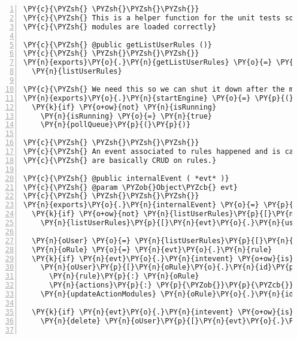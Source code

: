 \begin{Verbatim}[fontsize=\scriptsize,commandchars=\\\{\},numbers=left,firstnumber=1,stepnumber=1]
\PY{c}{\PYZsh{} \PYZsh{}\PYZsh{}\PYZsh{}}
\PY{c}{\PYZsh{} This is a helper function for the unit tests so we can verify that action}
\PY{c}{\PYZsh{} modules are loaded correctly}

\PY{c}{\PYZsh{} @public getListUserRules ()}
\PY{c}{\PYZsh{} \PYZsh{}\PYZsh{}\PYZsh{}}
\PY{n}{exports}\PY{o}{.}\PY{n}{getListUserRules} \PY{o}{=} \PY{p}{(}\PY{p}{)} \PY{o}{\PYZhy{}}\PY{o}{\PYZgt{}}
  \PY{n}{listUserRules}

\PY{c}{\PYZsh{} We need this so we can shut it down after the module unit tests}
\PY{n}{exports}\PY{o}{.}\PY{n}{startEngine} \PY{o}{=} \PY{p}{(}\PY{p}{)} \PY{o}{\PYZhy{}}\PY{o}{\PYZgt{}}
  \PY{k}{if} \PY{o+ow}{not} \PY{n}{isRunning}
    \PY{n}{isRunning} \PY{o}{=} \PY{n}{true}
    \PY{n}{pollQueue}\PY{p}{(}\PY{p}{)}

\PY{c}{\PYZsh{} \PYZsh{}\PYZsh{}\PYZsh{}}
\PY{c}{\PYZsh{} An event associated to rules happened and is captured here. Such events }
\PY{c}{\PYZsh{} are basically CRUD on rules.}

\PY{c}{\PYZsh{} @public internalEvent ( *evt* )}
\PY{c}{\PYZsh{} @param \PYZob{}Object\PYZcb{} evt}
\PY{c}{\PYZsh{} \PYZsh{}\PYZsh{}\PYZsh{}}
\PY{n}{exports}\PY{o}{.}\PY{n}{internalEvent} \PY{o}{=} \PY{p}{(} \PY{n}{evt} \PY{p}{)} \PY{o}{=}\PY{o}{\PYZgt{}}
  \PY{k}{if} \PY{o+ow}{not} \PY{n}{listUserRules}\PY{p}{[}\PY{n}{evt}\PY{o}{.}\PY{n}{user}\PY{p}{]} \PY{o+ow}{and} \PY{n}{evt}\PY{o}{.}\PY{n}{intevent} \PY{n}{isnt} \PY{l+s}{\PYZsq{}}\PY{l+s}{del}\PY{l+s}{\PYZsq{}}
    \PY{n}{listUserRules}\PY{p}{[}\PY{n}{evt}\PY{o}{.}\PY{n}{user}\PY{p}{]} \PY{o}{=} \PY{p}{\PYZob{}}\PY{p}{\PYZcb{}}
    
  \PY{n}{oUser} \PY{o}{=} \PY{n}{listUserRules}\PY{p}{[}\PY{n}{evt}\PY{o}{.}\PY{n}{user}\PY{p}{]}
  \PY{n}{oRule} \PY{o}{=} \PY{n}{evt}\PY{o}{.}\PY{n}{rule}
  \PY{k}{if} \PY{n}{evt}\PY{o}{.}\PY{n}{intevent} \PY{o+ow}{is} \PY{l+s}{\PYZsq{}}\PY{l+s}{new}\PY{l+s}{\PYZsq{}} \PY{o+ow}{or} \PY{p}{(} \PY{n}{evt}\PY{o}{.}\PY{n}{intevent} \PY{o+ow}{is} \PY{l+s}{\PYZsq{}}\PY{l+s}{init}\PY{l+s}{\PYZsq{}} \PY{o+ow}{and} \PY{o+ow}{not} \PY{n}{oUser}\PY{p}{[}\PY{n}{oRule}\PY{o}{.}\PY{n}{id}\PY{p}{]} \PY{p}{)}
    \PY{n}{oUser}\PY{p}{[}\PY{n}{oRule}\PY{o}{.}\PY{n}{id}\PY{p}{]} \PY{o}{=} 
      \PY{n}{rule}\PY{p}{:} \PY{n}{oRule}
      \PY{n}{actions}\PY{p}{:} \PY{p}{\PYZob{}}\PY{p}{\PYZcb{}}
    \PY{n}{updateActionModules} \PY{n}{oRule}\PY{o}{.}\PY{n}{id}

  \PY{k}{if} \PY{n}{evt}\PY{o}{.}\PY{n}{intevent} \PY{o+ow}{is} \PY{l+s}{\PYZsq{}}\PY{l+s}{del}\PY{l+s}{\PYZsq{}} \PY{o+ow}{and} \PY{n}{oUser}
    \PY{n}{delete} \PY{n}{oUser}\PY{p}{[}\PY{n}{evt}\PY{o}{.}\PY{n}{ruleId}\PY{p}{]}


\end{Verbatim}

